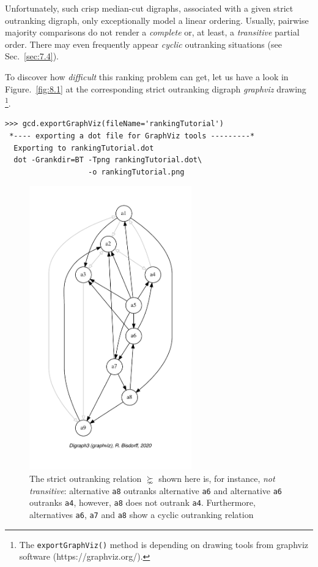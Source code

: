Unfortunately, such crisp median-cut \Condorcet digraphs, associated with a given strict outranking digraph, only exceptionally model a linear ordering. Usually, pairwise majority comparisons do not render a \emph{complete} or, at least, a \emph{transitive} partial order. There may even frequently appear \emph{cyclic} outranking situations (see Sec.~\ref{sec:7.4}).

To discover how \emph{difficult} this ranking problem can get, let us have a look in Figure.~\vref{fig:8.1} at the corresponding strict outranking digraph \emph{graphviz} drawing \footnote{ The \texttt{exportGraphViz()} method is depending on drawing tools from graphviz software (https://graphviz.org/).}.
\begin{lstlisting}
>>> gcd.exportGraphViz(fileName='rankingTutorial')
 *---- exporting a dot file for GraphViz tools ---------*
  Exporting to rankingTutorial.dot
  dot -Grankdir=BT -Tpng rankingTutorial.dot\
                   -o rankingTutorial.png
\end{lstlisting}
\begin{figure}[ht]
\sidecaption[t]
\includegraphics[width=7cm]{Figures/8-1-rankingTutorial.pdf}
\caption{The strict outranking relation $\succnsim$ shown here is, for instance, \emph{not transitive}: alternative \texttt{a8} outranks alternative \texttt{a6} and alternative \texttt{a6} outranks \texttt{a4}, however, \texttt{a8} does not outrank \texttt{a4}. Furthermore, alternatives \texttt{a6}, \texttt{a7} and \texttt{a8} show a cyclic outranking relation}
\label{fig:8.1}       %
\end{figure}

